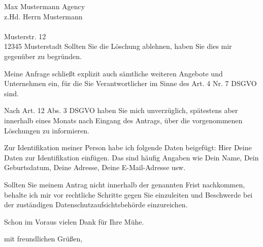 \documentclass[a4paper, pagenumber=footmiddle, parskip=half,
	foldmarks=true,foldmarks=BmT,
	fromalign=right,  %
	fromphone=false, fromfax=false, fromemail=true, fromurl=true, fromlogo=true,
	fromrule=false, version=last]{scrlttr2}
\begin{document}
\begin{letter}{
	Max Mustermann Agency\\ 
	z.Hd. Herrn Mustermann\\ \ \\
	Musterstr. 12\\
	12345 Musterstadt
}
Sollten Sie die Löschung ablehnen, haben Sie dies mir gegenüber zu begründen.

Meine Anfrage schließt explizit auch sämtliche weiteren Angebote und Unternehmen ein, für die Sie Verantwortlicher im Sinne des Art. 4 Nr. 7 DSGVO sind.

Nach Art. 12 Abs. 3 DSGVO haben Sie mich unverzüglich, spätestens aber innerhalb eines Monats nach Eingang des Antrags, über die vorgenommenen Löschungen zu informieren.

Zur Identifikation meiner Person habe ich folgende Daten beigefügt:
Hier Deine Daten zur Identifikation einfügen. Das sind häufig Angaben wie Dein Name, Dein Geburtsdatum, Deine Adresse, Deine E-Mail-Adresse usw.

Sollten Sie meinem Antrag nicht innerhalb der genannten Frist nachkommen, behalte ich mir vor rechtliche Schritte gegen Sie einzuleiten und Beschwerde bei der zuständigen Datenschutzaufsichtsbehörde einzureichen.

Schon im Voraus vielen Dank für Ihre Mühe.


\closing{mit freundlichen Grüßen,}


\end{letter}
\end{document}

